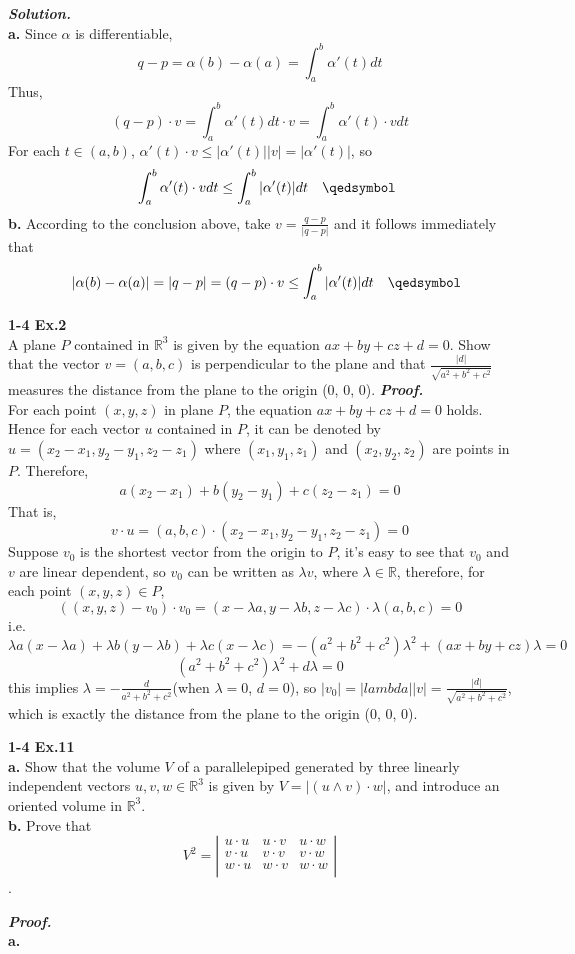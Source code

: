 \documentclass{article}
\begin{document}
\par
\textbf{\textit{Solution.}}\\
\textbf{a. } Since $\alpha$ is differentiable,
$$
    q - p = \alpha(b) - \alpha(a) = \int_a^b \alpha'(t)dt
$$
Thus,
$$
    (q - p) \cdot v = \int_a^b \alpha'(t) dt \cdot v = \int_a^b \alpha'(t) \cdot vdt
$$
For each $t \in (a, b)$, $\alpha'(t) \cdot v \leq |\alpha'(t)||v| = |\alpha'(t)|$, so
$$
    \quad \int_a^b \alpha'(t) \cdot vdt \leq \int_a^b |\alpha'(t)|dt \quad \qedsymbol
$$
\textbf{b. } According to the conclusion above, take $v = \frac{q - p}{|q - p|}$ and
it follows immediately that
$$
    \quad |\alpha(b) - \alpha(a)| = |q - p| = (q - p) \cdot v \leq \int_a^b |\alpha'(t)|dt \quad \qedsymbol
$$

\par
\textbf{1-4 Ex.2}\\
A plane $P$ contained in $\mathbb{R}^3$ is given by the equation $ax+by+cz+d=0$. Show that the vector $v=(a,b,c)$
is perpendicular to the plane and that $\frac{|d|}{\sqrt{a^2+b^2+c^2}}$ measures the distance from the plane to the origin
(0, 0, 0).
\textbf{\textit{Proof.}}\\
For each point $(x, y, z)$ in plane $P$, the equation $ax+by+cz+d=0$ holds. Hence for each vector $u$ contained in $P$,
it can be denoted by $u = (x_2-x_1, y_2-y_1, z_2-z_1)$ where $(x_1, y_1, z_1)$ and $(x_2, y_2, z_2)$ are points in $P$.
Therefore,
$$
    a(x_2-x_1) + b(y_2-y_1) + c(z_2-z_1) = 0
$$
That is,
$$
    v \cdot u = (a, b, c) \cdot (x_2-x_1, y_2-y_1, z_2-z_1) = 0
$$
Suppose $v_0$ is the shortest vector from the origin to $P$, it's easy to see that $v_0$ and $v$ are linear dependent, so
$v_0$ can be written as $\lambda v$, where $\lambda \in \mathbb{R}$, therefore, for each point $(x,y,z) \in P$, 
$$
    ((x,y,z) - v_0) \cdot v_0 = (x-\lambda a, y-\lambda b, z-\lambda c) \cdot \lambda (a,b,c) = 0
$$
i.e.
$$
    \lambda a(x-\lambda a) + \lambda b(y-\lambda b) + \lambda c(x-\lambda c) = -(a^2+b^2+c^2)\lambda^2 + (ax+by+cz)\lambda = 0
$$
$$
    (a^2+b^2+c^2)\lambda^2 + d\lambda = 0
$$
this implies $\lambda=-\frac{d}{a^2+b^2+c^2}$(when $\lambda = 0$, $d = 0$), so $|v_0| = |lambda||v| = \frac{|d|}{\sqrt{a^2+b^2+c^2}}$,
which is exactly the distance from the plane to the origin (0, 0, 0).

\par
\textbf{1-4 Ex.11}\\
\textbf{a. }Show that the volume $V$ of a parallelepiped generated by three linearly independent vectors $u,v,w \in \mathbb{R}^3$ is
given by $V = |(u \wedge v) \cdot w|$, and introduce an oriented volume in $\mathbb{R}^3$.\\
\textbf{b. }Prove that
$$
    V^2 = 
    \left|\begin{array}{ccc} 
        u \cdot u & u \cdot v & u \cdot w \\ 
        v \cdot u & v \cdot v & v \cdot w \\ 
        w \cdot u & w \cdot v & w \cdot w \\ 
    \end{array}\right|
$$.

\par
\textbf{\textit{Proof.}}\\
\textbf{a. }
\end{document}
